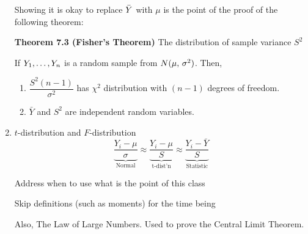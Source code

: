 \begin{enumerate}[label=\textcircled{\raisebox{-1pt}{\arabic*}}]
        \nl Showing it is okay to replace $\bar{Y}$ with $\mu$ is the point of the proof of the following theorem:

        
        \nnl \textbf{Theorem 7.3 (Fisher's Theorem)} The distribution of sample variance $S^2$

        \nl If $Y_1, \dots, Y_n$ is a random sample from $\normalDist*$. Then,
        \begin{enumerate}[label=\textcircled{\raisebox{-1pt}{\arabic*}}]
            \item 
                $\dfrac{S^2(n-1)}{\sigma^2}$ has $\chi^2$ distribution with $(n-1)$ degrees of freedom.
            
            \item
                $\bar{Y}$ and $S^2$ are independent random variables.

        \end{enumerate}

                    
        \item
        $t$-distribution and $F$-distribution
        $$\underbrace{\frac{Y_i-\mu}{\sigma}}_{\text{Normal}} \approx \underbrace{\frac{Y_i -\mu}{S}}_{\text{t-dist'n}} \approx \underbrace{\frac{Y_i - \bar{Y}}{S}}_{\text{Statistic}}$$

        \nl Address when to use what is the point of this class

        \nl Skip definitions (such as moments) for the time being

        \nl Also, The Law of Large Numbers. Used to prove the Central Limit Theorem.
\end{enumerate}






